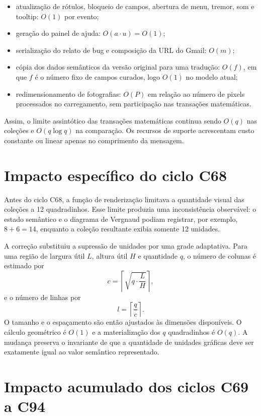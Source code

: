 \documentclass[12pt,a4paper]{article}
\begin{document}
\begin{itemize}[noitemsep]
  \item atualização de rótulos, bloqueio de campos, abertura de menu, tremor, som e tooltip: $O(1)$ por evento;
  \item geração do painel de ajuda: $O(a\cdot u)=O(1)$;
  \item serialização do relato de bug e composição da URL do Gmail: $O(m)$;
  \item cópia dos dados semânticos da versão original para uma tradução: $O(f)$, em que $f$ é o número fixo de campos curados, logo $O(1)$ no modelo atual;
  \item redimensionamento de fotografias: $O(P)$ em relação ao número de pixels processados no carregamento, sem participação nas transações matemáticas.
\end{itemize}

Assim, o limite assintótico das transações matemáticas continua sendo $O(q)$ nas coleções e $O(q\log q)$ na comparação. Os recursos de suporte acrescentam custo constante ou linear apenas no comprimento da mensagem.

\section{Impacto específico do ciclo C68}

Antes do ciclo C68, a função de renderização limitava a quantidade visual das coleções a 12 quadradinhos. Esse limite produzia uma inconsistência observável: o estado semântico e o diagrama de Vergnaud podiam registrar, por exemplo, $8+6=14$, enquanto a coleção resultante exibia somente 12 unidades.

A correção substituiu a supressão de unidades por uma grade adaptativa. Para uma região de largura útil $L$, altura útil $H$ e quantidade $q$, o número de colunas é estimado por
\[
c=\left\lceil\sqrt{q\cdot\frac{L}{H}}\right\rceil,
\]
e o número de linhas por
\[
l=\left\lceil\frac{q}{c}\right\rceil.
\]
O tamanho e o espaçamento são então ajustados às dimensões disponíveis. O cálculo geométrico é $O(1)$ e a materialização dos $q$ quadradinhos é $O(q)$. A mudança preserva o invariante de que a quantidade de unidades gráficas deve ser exatamente igual ao valor semântico representado.


\section{Impacto acumulado dos ciclos C69 a C94}
\end{document}
